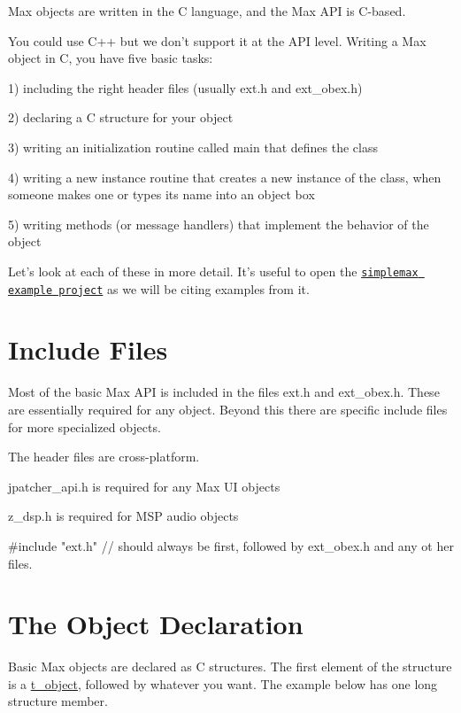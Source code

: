 Max objects are written in the C language, and the Max API is C-\/based.

You could use C++ but we don't support it at the API level. Writing a Max object in C, you have five basic tasks:

1) including the right header files (usually ext.h and ext\_\-obex.h)

2) declaring a C structure for your object

3) writing an initialization routine called main that defines the class

4) writing a new instance routine that creates a new instance of the class, when someone makes one or types its name into an object box

5) writing methods (or message handlers) that implement the behavior of the object

Let's look at each of these in more detail. It's useful to open the \href{simplemax_8c-source.html}{\tt simplemax example project} as we will be citing examples from it.\hypertarget{chapter_anatomy_chapter_anatomy_includes}{}\section{Include Files}\label{chapter_anatomy_chapter_anatomy_includes}
Most of the basic Max API is included in the files ext.h and ext\_\-obex.h. These are essentially required for any object. Beyond this there are specific include files for more specialized objects.

The header files are cross-\/platform.


\begin{DoxyItemize}
\item jpatcher\_\-api.h is required for any Max UI objects
\item z\_\-dsp.h is required for MSP audio objects
\end{DoxyItemize}


\begin{DoxyCode}
    #include "ext.h" // should always be first, followed by ext_obex.h and any ot
      her files.
\end{DoxyCode}
\hypertarget{chapter_anatomy_chapter_anatomy_object_decl}{}\section{The Object Declaration}\label{chapter_anatomy_chapter_anatomy_object_decl}
Basic Max objects are declared as C structures. The first element of the structure is a \hyperlink{structt__object}{t\_\-object}, followed by whatever you want. The example below has one long structure member.


